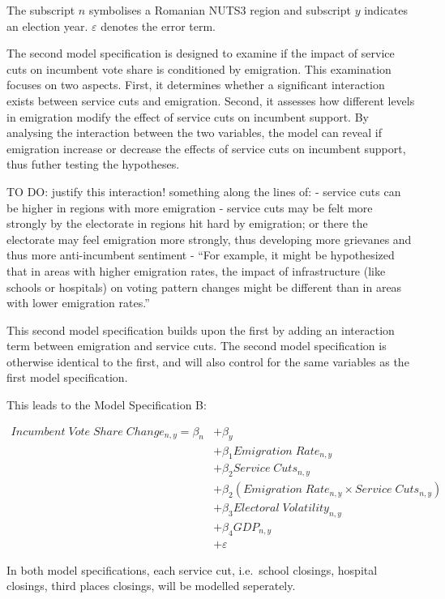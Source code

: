 \documentclass[
]{article}
\begin{document}
The subscript \(n\) symbolises a Romanian NUTS3 region and subscript
\(y\) indicates an election year. \(ε\) denotes the error term.

The second model specification is designed to examine if the impact of
service cuts on incumbent vote share is conditioned by emigration. This
examination focuses on two aspects. First, it determines whether a
significant interaction exists between service cuts and emigration.
Second, it assesses how different levels in emigration modify the effect
of service cuts on incumbent support. By analysing the interaction
between the two variables, the model can reveal if emigration increase
or decrease the effects of service cuts on incumbent support, thus
futher testing the hypotheses.

TO DO: justify this interaction! something along the lines of: - service
cuts can be higher in regions with more emigration - service cuts may be
felt more strongly by the electorate in regions hit hard by emigration;
or there the electorate may feel emigration more strongly, thus
developing more grievanes and thus more anti-incumbent sentiment - ``For
example, it might be hypothesized that in areas with higher emigration
rates, the impact of infrastructure (like schools or hospitals) on
voting pattern changes might be different than in areas with lower
emigration rates.''

This second model specification builds upon the first by adding an
interaction term between emigration and service cuts. The second model
specification is otherwise identical to the first, and will also control
for the same variables as the first model specification.

This leads to the Model Specification B:

\begin{equation*}
\begin{aligned}
Incumbent \; Vote \; Share \; Change_{n, y} = \beta_n & + \beta_y & \\
      & + \beta_1Emigration \; Rate_{n, y} \\
      & + \beta_2Service \; Cuts_{n, y} \\
      & + \beta_2 (Emigration \; Rate_{n, y} \times Service \; Cuts_{n, y}) \\
      & + \beta_3Electoral \; Volatility_{n, y} \\
      & + \beta_4GDP_{n, y} \\
      & + \varepsilon
\end{aligned}
\end{equation*}

In both model specifications, each service cut, i.e.~school closings,
hospital closings, third places closings, will be modelled seperately.
\end{document}
